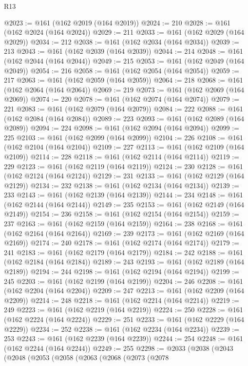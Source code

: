 \begin{lexlean}{R13}
\begin{coremodule}
{{{{{{{{{{{{{{{{{{{{{{{{{{{{{{{{{{{{{{{{{{{{{{{{{{{{{{{{{{{{{{{{{{{{{{{{{{{{{{{{{{{{{{{{{{{{{{{{{{{{{{{{{{@2023 := @161 (@162 @2019 (@164 @2019))
@2024 := 210
@2028 := @161 (@162 @2024 (@164 @2024))
@2029 := 211
@2033 := @161 (@162 @2029 (@164 @2029))
@2034 := 212
@2038 := @161 (@162 @2034 (@164 @2034))
@2039 := 213
@2043 := @161 (@162 @2039 (@164 @2039))
@2044 := 214
@2048 := @161 (@162 @2044 (@164 @2044))
@2049 := 215
@2053 := @161 (@162 @2049 (@164 @2049))
@2054 := 216
@2058 := @161 (@162 @2054 (@164 @2054))
@2059 := 217
@2063 := @161 (@162 @2059 (@164 @2059))
@2064 := 218
@2068 := @161 (@162 @2064 (@164 @2064))
@2069 := 219
@2073 := @161 (@162 @2069 (@164 @2069))
@2074 := 220
@2078 := @161 (@162 @2074 (@164 @2074))
@2079 := 221
@2083 := @161 (@162 @2079 (@164 @2079))
@2084 := 222
@2088 := @161 (@162 @2084 (@164 @2084))
@2089 := 223
@2093 := @161 (@162 @2089 (@164 @2089))
@2094 := 224
@2098 := @161 (@162 @2094 (@164 @2094))
@2099 := 225
@2103 := @161 (@162 @2099 (@164 @2099))
@2104 := 226
@2108 := @161 (@162 @2104 (@164 @2104))
@2109 := 227
@2113 := @161 (@162 @2109 (@164 @2109))
@2114 := 228
@2118 := @161 (@162 @2114 (@164 @2114))
@2119 := 229
@2123 := @161 (@162 @2119 (@164 @2119))
@2124 := 230
@2128 := @161 (@162 @2124 (@164 @2124))
@2129 := 231
@2133 := @161 (@162 @2129 (@164 @2129))
@2134 := 232
@2138 := @161 (@162 @2134 (@164 @2134))
@2139 := 233
@2143 := @161 (@162 @2139 (@164 @2139))
@2144 := 234
@2148 := @161 (@162 @2144 (@164 @2144))
@2149 := 235
@2153 := @161 (@162 @2149 (@164 @2149))
@2154 := 236
@2158 := @161 (@162 @2154 (@164 @2154))
@2159 := 237
@2163 := @161 (@162 @2159 (@164 @2159))
@2164 := 238
@2168 := @161 (@162 @2164 (@164 @2164))
@2169 := 239
@2173 := @161 (@162 @2169 (@164 @2169))
@2174 := 240
@2178 := @161 (@162 @2174 (@164 @2174))
@2179 := 241
@2183 := @161 (@162 @2179 (@164 @2179))
@2184 := 242
@2188 := @161 (@162 @2184 (@164 @2184))
@2189 := 243
@2193 := @161 (@162 @2189 (@164 @2189))
@2194 := 244
@2198 := @161 (@162 @2194 (@164 @2194))
@2199 := 245
@2203 := @161 (@162 @2199 (@164 @2199))
@2204 := 246
@2208 := @161 (@162 @2204 (@164 @2204))
@2209 := 247
@2213 := @161 (@162 @2209 (@164 @2209))
@2214 := 248
@2218 := @161 (@162 @2214 (@164 @2214))
@2219 := 249
@2223 := @161 (@162 @2219 (@164 @2219))
@2224 := 250
@2228 := @161 (@162 @2224 (@164 @2224))
@2229 := 251
@2233 := @161 (@162 @2229 (@164 @2229))
@2234 := 252
@2238 := @161 (@162 @2234 (@164 @2234))
@2239 := 253
@2243 := @161 (@162 @2239 (@164 @2239))
@2244 := 254
@2248 := @161 (@162 @2244 (@164 @2244))
@2249 := 255
@2298 := @2033
    (@2038
      (@2043
        (@2048
          (@2053
            (@2058
              (@2063
                (@2068
                  (@2073
                    (@2078
}}}}}}}}}}}}}}}}}}}}}}}}}}}}}}}}}}}}}}}}}}}}}}}}}}}}}}}}}}}}}}}}}}}}}}}}}}}}}}}}}}}}}}}}}}}}}}}}}}}}}}}}}}
\end{coremodule}
\end{lexlean}
